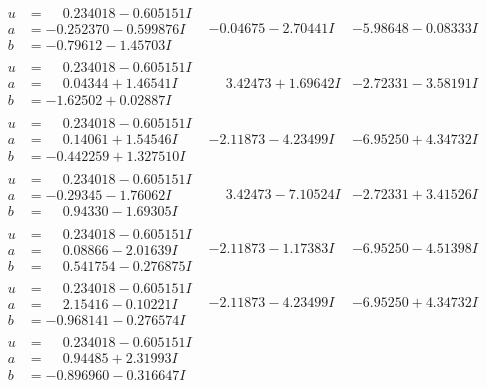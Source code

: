 \documentclass[1p]{elsarticle_modified}
\theoremstyle{definition}
\begin{document}
$$\begin{array}{c|c|c}
\begin{aligned}
u &= \phantom{-}0.234018 - 0.605151 I \\
a &= -0.252370 - 0.599876 I \\
b &= -0.79612 - 1.45703 I\end{aligned}
 & -0.04675 - 2.70441 I & -5.98648 - 0.08333 I \\ \hline\begin{aligned}
u &= \phantom{-}0.234018 - 0.605151 I \\
a &= \phantom{-}0.04344 + 1.46541 I \\
b &= -1.62502 + 0.02887 I\end{aligned}
 & \phantom{-}3.42473 + 1.69642 I & -2.72331 - 3.58191 I \\ \hline\begin{aligned}
u &= \phantom{-}0.234018 - 0.605151 I \\
a &= \phantom{-}0.14061 + 1.54546 I \\
b &= -0.442259 + 1.327510 I\end{aligned}
 & -2.11873 - 4.23499 I & -6.95250 + 4.34732 I \\ \hline\begin{aligned}
u &= \phantom{-}0.234018 - 0.605151 I \\
a &= -0.29345 - 1.76062 I \\
b &= \phantom{-}0.94330 - 1.69305 I\end{aligned}
 & \phantom{-}3.42473 - 7.10524 I & -2.72331 + 3.41526 I \\ \hline\begin{aligned}
u &= \phantom{-}0.234018 - 0.605151 I \\
a &= \phantom{-}0.08866 - 2.01639 I \\
b &= \phantom{-}0.541754 - 0.276875 I\end{aligned}
 & -2.11873 - 1.17383 I & -6.95250 - 4.51398 I \\ \hline\begin{aligned}
u &= \phantom{-}0.234018 - 0.605151 I \\
a &= \phantom{-}2.15416 - 0.10221 I \\
b &= -0.968141 - 0.276574 I\end{aligned}
 & -2.11873 - 4.23499 I & -6.95250 + 4.34732 I \\ \hline\begin{aligned}
u &= \phantom{-}0.234018 - 0.605151 I \\
a &= \phantom{-}0.94485 + 2.31993 I \\
b &= -0.896960 - 0.316647 I\end{aligned}

\end{array}$$
\end{document}
